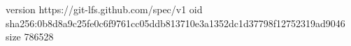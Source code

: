 version https://git-lfs.github.com/spec/v1
oid sha256:0b8d8a9c25fe0c6f9761cc05ddb813710e3a1352dc1d37798f12752319ad9046
size 786528
